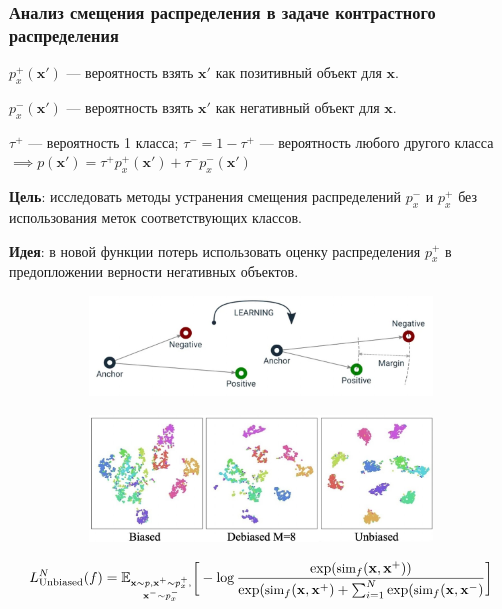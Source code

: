 \documentclass[
	11pt, %
]{beamer}
\begin{document}
\begin{frame}
    \frametitle{Анализ смещения распределения в задаче контрастного распределения}
\scriptsize 
$p^+_x(\mathbf{x'})$ — вероятность взять $\mathbf{x'}$ как позитивный объект для $\mathbf{x}$.


$p^-_x(\mathbf{x'})$ — вероятность взять $\mathbf{x'}$ как негативный объект для $\mathbf{x}$.

$\tau^+$ — вероятность 1 класса; $\tau^- = 1 - \tau^+$ — вероятность любого другого класса $\implies p(\mathbf{x'}) = \tau^+ p_x^+(\mathbf{x'}) + \tau^-p_x^-(\mathbf{x'})$

\textbf{Цель}: исследовать методы устранения смещения распределений $p_x^-$ и $p_x^+$ без использования меток соответствующих классов.

 \textbf{Идея}: в новой функции потерь использовать оценку распределения $p_x^+$ в предопложении верности негативных объектов.

\begin{figure}
\centering
\begin{subfigure}
  \centering
  \includegraphics[width=.4\linewidth]{Images/triplet.jpeg}
  \label{fig:sub1}
\end{subfigure}%
\begin{subfigure}
  \centering
  \includegraphics[width=.5\linewidth]{Images/t-SNE.jpeg}
  \label{fig:sub2}
\end{subfigure}
\label{fig:test}
\end{figure}


\begin{equation*} \small
L_{\text{Unbiased}}^N(f) = \mathbb{E}_{\substack{\mathbf{x} \sim p, \mathbf{x^+} \sim p^+_x,\\ \mathbf{x^-} \sim p_x^-}} \bigg[-\log \frac{\exp (\text{sim}_f(\mathbf{x}, \mathbf{x^+}))}{\exp (\text{sim}_f(\mathbf{x}, \mathbf{x^+}) + \sum _{i=1}^N \exp (\text{sim}_f(\mathbf{x}, \mathbf{x^-})}\bigg]

\end{equation*}
\end{frame}


\end{document}
